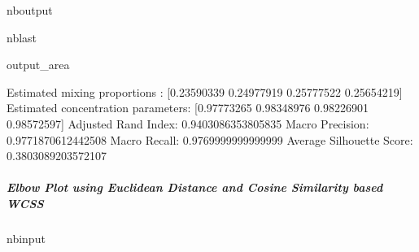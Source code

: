 \documentclass[letterpaper,10pt,english,openany,oneside]{sphinxmanual}
\begin{document}
{{{{\begin{sphinxuseclass}{nboutput}
\begin{sphinxuseclass}{nblast}
{
\begin{sphinxuseclass}{output_area}
\begin{sphinxuseclass}{}


\begin{sphinxVerbatim}[commandchars=\\\{\}]
Estimated mixing proportions : [0.23590339 0.24977919 0.25777522 0.25654219]
Estimated concentration parameters:  [0.97773265 0.98348976 0.98226901 0.98572597]
Adjusted Rand Index: 0.9403086353805835
Macro Precision: 0.9771870612442508
Macro Recall: 0.9769999999999999
Average Silhouette Score: 0.3803089203572107
\end{sphinxVerbatim}



\end{sphinxuseclass}
\end{sphinxuseclass}
}

\end{sphinxuseclass}
\end{sphinxuseclass}

\subparagraph{Elbow Plot using Euclidean Distance and Cosine Similarity based WCSS}
\label{\detokenize{user_guide/basic_usage:Elbow-Plot-using-Euclidean-Distance-and-Cosine-Similarity-based-WCSS}}
\begin{sphinxuseclass}{nbinput}
{
\begin{sphinxVerbatim}[commandchars=\\\{\}]
\llap{\color{nbsphinxin}[15]:\,\hspace{\fboxrule}\hspace{\fboxsep}}  \PYG{p}{[}\PYG{p}{]}
  \PYG{p}{[}\PYG{p}{]}

    
      


\end{sphinxVerbatim}}
\end{sphinxuseclass}}}}}
\end{document}
